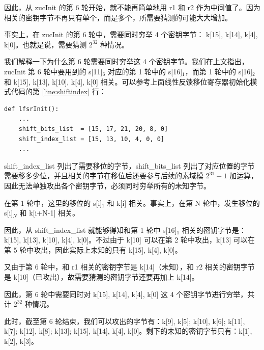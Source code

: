 因此，从 {\cnsls zucInit} 的第 6 轮开始，就不能再简单地用 {\cnsls r1} 和 {\cnsls r2} 作为中间值了。因为相关的密钥字节不再只有单个，而是多个，所需要猜测的可能大大增加。

事实上，在 {\cnsls zucInit} 的第 6 轮中，需要同时穷举 4 个密钥字节： {\cnsls k[15], k[14], k[4], k[0]}。也就是说，需要猜测 $2^{32}$ 种情况。

\newpage

我们解释一下为什么第 6 轮需要同时穷举这 4 个密钥字节。我们在上文指出，{\cnsls zucInit} 第 6 轮中要用到的 {\cnsls s[11]$_6$} 对应的第 1 轮中的 {\cnsls s[16]$_1$}，而第 1 轮中的 {\cnsls s[16]$_2$} 和 {\cnsls k[15], k[13], k[10], k[4], k[0]} 相关。可以参考上面线性反馈移位寄存器初始化模式代码的第 \ref{line:shiftindex} 行：

\begin{lstlisting}[style=myPython]
def lfsrInit():
    ...
    shift_bits_list  = [15, 17, 21, 20, 8, 0]
    shift_index_list = [15, 13, 10, 4, 0, 0]
    ...
\end{lstlisting}

{\cnsls shift\_index\_list} 列出了需要移位的字节，{\cnsls shift\_bits\_list} 列出了对应位置的字节需要移多少位，并且相关的字节在移位后还要参与后续的素域模 $2^{31}-1$ 加运算，因此无法单独攻出各个密钥字节，必须同时穷举所有的未知字节。

在第 1 轮中，这里的移位的 {\cnsls s[i]$_1$} 和 {\cnsls k[i]} 相关。事实上，在第 N 轮中，发生移位的 {\cnsls s[i]$_N$} 和 {\cnsls k[i+N-1]} 相关。

因此，从 {\cnsls shift\_index\_list} 就能够得知和第 1 轮中 {\cnsls s[16]$_1$} 相关的密钥字节是：{\cnsls k[15], k[13], k[10], k[4], k[0]}。不过由于 {\cnsls k[10]} 可以在第 2 轮中攻出，{\cnsls k[13]} 可以在第 5 轮中攻出，因此实际上未知的只有 {\cnsls k[15], k[4], k[0]}。

又由于第 6 轮中，和 {\cnsls r1} 相关的密钥字节是 {\cnsls k[14]}（未知），和 {\cnsls r2} 相关的密钥字节是 {\cnsls k[10]}（已攻出），故需要猜测的密钥字节还要再加上 {\cnsls k[14]}。

因此，第 6 轮中需要同时对 {\cnsls k[15], k[14], k[4], k[0]} 这 4 个密钥字节进行穷举，共计 $2^{32}$ 种情况。

\vspace*{0.5\baselineskip}

此时，截至第 6 轮结束，我们可以攻出的字节有：{\cnsls k[9], k[5]; k[10], k[6]; k[11], k[7]; k[12], k[8]; k[13]; k[15], k[14], k[4], k[0]}。剩下的未知的密钥字节只有：{\cnsls k[1], k[2], k[3]}。

\vspace*{0.5\baselineskip}


